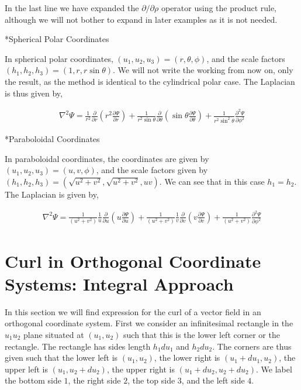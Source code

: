 \documentclass[11pt]{amsart}
\makeatletter
\def\subsection{\@startsection{subsection}{3}%
  \z@{.5\linespacing\@plus.7\linespacing}{.1\linespacing}%
  {\normalfont\itshape}}
\makeatother
\begin{document}
In the last line we have expanded the $\partial/\partial\rho$ operator using the product rule, although we will not bother to expand in later examples as it is not needed.

\subsection*{Spherical Polar Coordinates}

In spherical polar coordinates, $(u_1, u_2, u_3) = (r, \theta, \phi)$, and the scale factors $(h_1, h_2, h_3) = (1, r, r\sin\theta)$. We will not write the working from now on, only the result, as the method is identical to the cylindrical polar case. The Laplacian is thus given by,

\begin{align*}
  \nabla^2\Psi=\frac{1}{r^2}\frac{\partial}{\partial r}\left(r^2\frac{\partial\Psi}{\partial r}\right)+\frac{1}{r^2\sin\theta}\frac{\partial}{\partial\theta}\left(\sin\theta\frac{\partial\Psi}{\partial\theta}\right)+\frac{1}{r^2\sin^2\theta}\frac{\partial^2\Psi}{\partial\phi^2}
\end{align*}

\subsection*{Paraboloidal Coordinates}

In paraboloidal coordinates, the coordinates are given by $(u_1, u_2, u_3) = (u, v, \phi)$, and the scale factors given by $(h_1, h_2, h_3) = (\sqrt{u^2 + v^2}, \sqrt{u^2 + v^2}, uv)$. We can see that in this case $h_1 = h_2$. The Laplacian is given by,

\begin{align*}
  \nabla^2\Psi=\frac{1}{(u^2+v^2)}\frac{1}{u}\frac{\partial}{\partial u}\left(u\frac{\partial\Psi}{\partial u}\right)+\frac{1}{(u^2+v^2)}\frac{1}{v}\frac{\partial}{\partial v}\left(v \frac{\partial\Psi}{\partial v}\right)+\frac{1}{(u^2 + v^2)}\frac{\partial^2\Psi}{\partial\phi^2}
\end{align*}

\section{Curl in Orthogonal Coordinate Systems: Integral Approach}

In this section we will find expression for the curl of a vector field in an orthogonal coordinate system. First we consider an infinitesimal rectangle in the $u_1u_2$ plane situated at $(u_1, u_2)$ such that this is the lower left corner or the rectangle. The rectangle has sides length $h_1du_1$ and $h_2du_2$. The corners are thus given such that the lower left is $(u_1, u_2)$, the lower right is $(u_1 + du_1, u_2)$, the upper left is $(u_1, u_2 + du_2)$, the upper right is $(u_1 + du_2, u_2 + du_2)$. We label the bottom side $1$, the right side $2$, the top side $3$, and the left side $4$.
\end{document}

